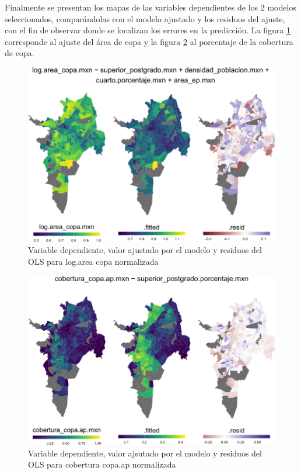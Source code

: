 \documentclass[12pt,]{book}
\begin{document}
Finalmente se presentan los mapas de las variables dependientes de los 2
modelos seleccionados, comparándolas con el modelo ajustado y los
residuos del ajuste, con el fin de observar donde se localizan los
errores en la predicción. La figura \ref{fig:mapas-lm-copa} corresponde
al ajuste del área de copa y la figura \ref{fig:mapas-lm-copaap} al
porcentaje de la cobertura de copa.

\begin{figure}
\includegraphics[width=1\linewidth]{tesis-unigis_files/figure-latex/mapas-lm-copa-1} \caption{Variable dependiente, valor ajustado por el modelo y residuos del OLS para log.area copa normalizada}\label{fig:mapas-lm-copa}
\end{figure}

\begin{figure}
\includegraphics[width=1\linewidth]{tesis-unigis_files/figure-latex/mapas-lm-copaap-1} \caption{Variable dependiente, valor ajsutado por el modelo y residuos del OLS para cobertura copa.ap normalizada}\label{fig:mapas-lm-copaap}
\end{figure}
\end{document}
